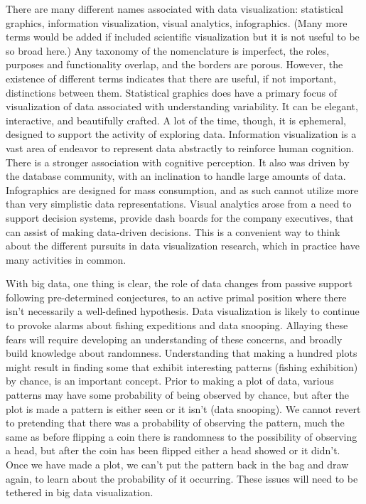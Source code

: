 \documentclass{article}
\begin{document}
There are many different names associated with data visualization: statistical graphics, information visualization, visual analytics, infographics. (Many more terms would be added if included scientific visualization but it is not useful to be so broad here.) Any taxonomy of the nomenclature is imperfect, the roles, purposes and functionality overlap, and the borders are porous. However, the existence of different terms indicates that there are useful, if not important, distinctions between them. Statistical graphics does have a primary focus of visualization of data associated with understanding variability. It can be elegant, interactive, and beautifully crafted. A lot of the time, though, it is ephemeral, designed to support the activity of exploring data.  Information visualization is a vast area of endeavor to represent data abstractly to reinforce human cognition. There is a stronger association with cognitive perception. It also was driven by the database community, with an inclination to handle large amounts of data.  Infographics are designed for mass consumption, and as such cannot utilize more than very simplistic data representations.  Visual analytics arose from a need to support decision systems, provide dash boards for the company executives, that can assist of making data-driven decisions. This is a convenient way to think about the different pursuits in data visualization research, which in practice have many activities in common.

With big data, one thing is clear, the role of data changes from passive support following pre-determined conjectures, to an active primal position where there isn't necessarily a well-defined hypothesis. Data visualization is likely to continue to provoke alarms about fishing expeditions and data snooping. Allaying these fears will require developing an understanding of these concerns, and broadly build knowledge about randomness. Understanding that making a hundred plots might result in finding some that exhibit interesting patterns (fishing exhibition) by chance, is an important concept. Prior to making a plot of data, various patterns may have some probability of being observed by chance, but after the plot is made a pattern is either seen or it isn't (data snooping).  We cannot revert to pretending that there was a probability of observing the pattern, much the same as before flipping a coin there is randomness to the possibility of observing a head, but after the coin has been flipped either a head showed or it didn't. Once we have made a plot, we can't put the pattern back in the bag and draw again, to learn about the probability of it occurring. These issues will need to be tethered in big data visualization.




\end{document}
